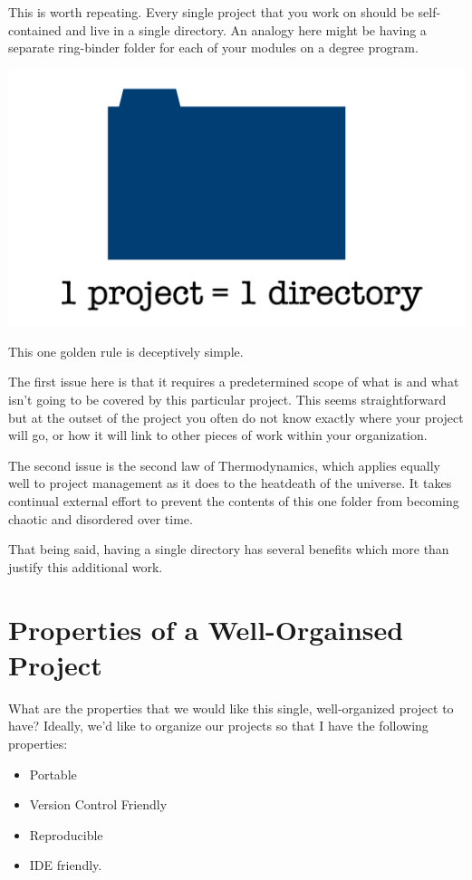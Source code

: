 \documentclass[
  12pt,
]{book}
\providecommand{\tightlist}{%
  \setlength{\itemsep}{0pt}\setlength{\parskip}{0pt}}
\begin{document}
This is worth repeating. Every single project that you work on should be self-contained and live in a single directory. An analogy here might be having a separate ring-binder folder for each of your modules on a degree program.

\includegraphics[width=0.8\linewidth]{images/101-workflows-organising-your-work/directory-structure-drawings/directory-structure-drawing-1}

This one golden rule is deceptively simple.

The first issue here is that it requires a predetermined scope of what is and
what isn't going to be covered by this particular project. This seems straightforward but at the outset of the project you often do not know exactly where your project will go, or how it will link to other pieces of work within your organization.

The second issue is the second law of Thermodynamics, which applies equally well to project management as it does to the heatdeath of the universe. It takes continual external effort to prevent the contents of this one folder from becoming chaotic and disordered over time.

That being said, having a single directory has several benefits which more than justify this additional work.

\hypertarget{properties-of-a-well-orgainsed-project}{%
\section{Properties of a Well-Orgainsed Project}\label{properties-of-a-well-orgainsed-project}}

What are the properties that we would like this single, well-organized project to have? Ideally, we'd like to organize our projects so that I have the following
properties:

\begin{itemize}
\tightlist
\item
  Portable
\item
  Version Control Friendly
\item
  Reproducible
\item
  IDE friendly.
\end{itemize}
\end{document}
